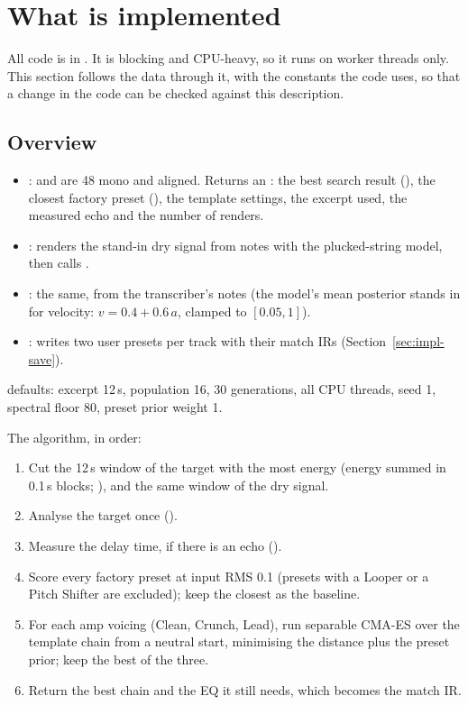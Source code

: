 \section{What is implemented}
\label{sec:impl}

All code is in . It is blocking and CPU-heavy, so it
runs on worker threads only. This section follows the data through it, with the
constants the code uses, so that a change in the code can be checked against
this description.

\subsection{Overview}

\begin{inapp}
\begin{itemize}
\item {} \done:  and
   are 48\kHz{} mono and aligned. Returns an : the best
  search result (), the closest factory preset (), the
  template settings, the excerpt used, the measured echo and the number of
  renders.
\item {} \done: renders the
  stand-in dry signal from notes with the plucked-string model, then calls
  .
\item {} \done: the
  same, from the transcriber's notes (the model's mean posterior stands in for
  velocity: $v = 0.4 + 0.6\,a$, clamped to $[0.05, 1]$).
\item {} \done: writes
  two user presets per track with their match IRs (Section~\ref{sec:impl-save}).
\end{itemize}
 defaults: excerpt 12\,s, population 16, 30 generations, all CPU
threads, seed 1, spectral floor 80\dB, preset prior weight 1.
\end{inapp}

The algorithm, in order:
\begin{enumerate}
\item Cut the 12\,s window of the target with the most energy (energy summed in
  0.1\,s blocks; ), and the same window of the dry signal.
\item Analyse the target once ().
\item Measure the delay time, if there is an echo ().
\item Score every factory preset at input RMS 0.1 (presets with a Looper or a
  Pitch Shifter are excluded); keep the closest as the baseline.
\item For each amp voicing (Clean, Crunch, Lead), run separable CMA-ES over the
  template chain from a neutral start, minimising the distance plus the preset
  prior; keep the best of the three.
\item Return the best chain and the EQ it still needs, which becomes the match
  IR.
\end{enumerate}

